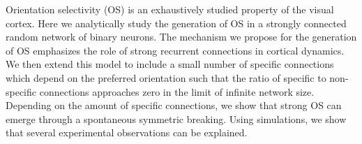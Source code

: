 Orientation selectivity (OS) is an exhaustively studied property of the visual cortex. Here we analytically study the generation of OS in a strongly connected random network of binary neurons. The mechanism we propose for the generation of OS emphasizes the role of strong recurrent connections in cortical dynamics. We then extend this model to include a small number of specific connections which depend on the preferred orientation such that the ratio of specific to non-specific connections approaches zero in the limit of infinite network size. Depending on the amount of specific connections, we show that strong OS can emerge through a spontaneous symmetric breaking. Using simulations, we show that several experimental observations can be explained. 


